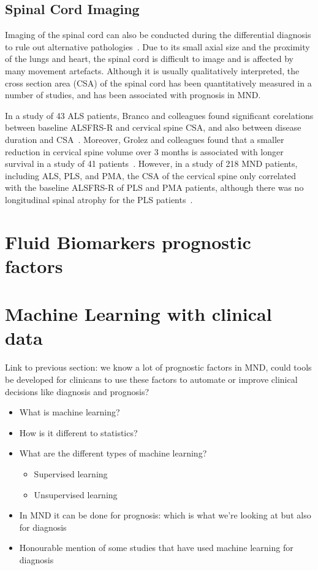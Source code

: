\subsection{Spinal Cord Imaging}

Imaging of the spinal cord can also be conducted during the differential diagnosis to rule out alternative pathologies~\cite{elmendiliSpinalCordImaging2019}.
Due to its small axial size and the proximity of the lungs and heart, the spinal cord is difficult to image and is affected by many movement artefacts.
Although it is usually qualitatively interpreted, the cross section area (CSA) of the spinal cord has been quantitatively measured in a number of studies, and has been associated with prognosis in MND.

In a study of 43 ALS patients, Branco and colleagues found significant corelations between baseline ALSFRS-R and cervical spine CSA, and also between disease duration and CSA~\cite{brancoSpinalCordAtrophy2014}.
Moreover, Grolez and colleagues found that a smaller reduction in cervical spine volume over 3 months is associated with longer survival in a study of 41 patients~\cite{grolezMRICervicalSpinal2018}.
However, in a study of 218 MND patients, including ALS, PLS, and PMA, the CSA of the cervical spine only correlated with the baseline ALSFRS-R of PLS and PMA patients, although there was no longitudinal spinal atrophy for the PLS patients~\cite{vanderburghCrosssectionalLongitudinalAssessment2019}.

\section{Fluid Biomarkers prognostic factors}


\section{Machine Learning with clinical data}

Link to previous section: we know a lot of prognostic factors in MND, could tools be developed for clinicans to use these factors to automate or improve clinical decisions like diagnosis and prognosis?


\begin{itemize}
    \item What is machine learning?
    \item How is it different to statistics?
    \item What are the different types of machine learning?
    \begin{itemize}
        \item Supervised learning
        \item Unsupervised learning
    \end{itemize}
    \item In MND it can be done for prognosis: which is what we're looking at but also for diagnosis
    \item Honourable mention of some studies that have used machine learning for diagnosis
\end{itemize}

